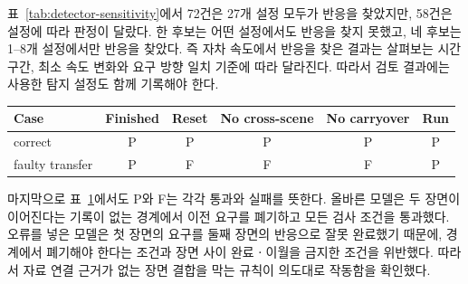 표~\ref{tab:detector-sensitivity}에서 72건은 27개 설정 모두가 반응을 찾았지만, 58건은 설정에 따라 판정이 달랐다. 한 후보는 어떤 설정에서도 반응을 찾지 못했고, 네 후보는 1--8개 설정에서만 반응을 찾았다. 즉 자차 속도에서 반응을 찾은 결과는 살펴보는 시간 구간, 최소 속도 변화와 요구 방향 일치 기준에 따라 달라진다. 따라서 검토 결과에는 사용한 탐지 설정도 함께 기록해야 한다.

\begin{table}[H]
\centering
{}
\label{tab:boundary-negative-control}
\scriptsize
\setlength{\tabcolsep}{2.5pt}
\begin{tabular}{lccccc}
\toprule
Case & Finished & Reset & No cross-scene & No carryover & Run \\
\midrule
correct & P & P & P & P & P \\
faulty transfer & P & F & F & F & P \\
\bottomrule
\end{tabular}
\end{table}

마지막으로 표~\ref{tab:boundary-negative-control}에서도 P와 F는 각각 통과와 실패를 뜻한다. 올바른 모델은 두 장면이 이어진다는 기록이 없는 경계에서 이전 요구를 폐기하고 모든 검사 조건을 통과했다. 오류를 넣은 모델은 첫 장면의 요구를 둘째 장면의 반응으로 잘못 완료했기 때문에, 경계에서 폐기해야 한다는 조건과 장면 사이 완료ㆍ이월을 금지한 조건을 위반했다. 따라서 자료 연결 근거가 없는 장면 결합을 막는 규칙이 의도대로 작동함을 확인했다.
